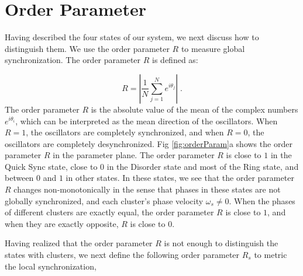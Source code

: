 \documentclass[%
 aip,
 amsmath,amssymb,
 reprint,%
]{revtex4-1}
\begin{document}
\section{Order Parameter}

Having described the four states of our system, we next discuss how to distinguish them. We use the order parameter $R$ to measure global synchronization. The order parameter $R$ is defined as:

\begin{equation}
    R=\left| \frac{1}{N}\sum_{j=1}^N{e^{i\theta _j}} \right|\;.
\end{equation}
The order parameter $R$ is the absolute value of the mean of the complex numbers $e^{i\theta _i}$, which can be interpreted as the mean direction of the oscillators. When $R=1$, the oscillators are completely synchronized, and when $R=0$, the oscillators are completely desynchronized. Fig \ref{fig:orderParam}a shows the order parameter $R$ in the parameter plane. The order parameter $R$ is close to $1$ in the Quick Sync state, close to $0$ in the Disorder state and most of the Ring state, and between $0$ and $1$ in other states. In these states, we see that the order parameter $R$ changes non-monotonically in the sense that phases in these states are not globally synchronized, and each cluster's phase velocity $\omega_s\ne 0$. When the phases of different clusters are exactly equal, the order parameter $R$ is close to $1$, and when they are exactly opposite, $R$ is close to $0$.

Having realized that the order parameter $R$ is not enough to distinguish the states with clusters, we next define the following order parameter $R_s$ to metric the local synchronization,
\end{document}
